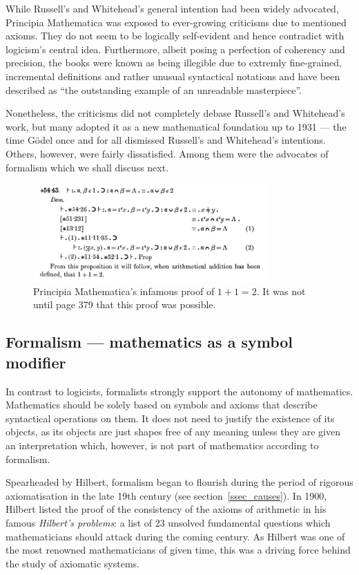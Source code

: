 \documentclass[hidelinks]{article}
\begin{document}
While Russell's and Whitehead's general intention had been widely advocated, Principia Mathematica was exposed to ever-growing criticisms due to mentioned axioms. They do not seem to be logically self-evident and hence contradict with logicism's central idea. Furthermore, albeit posing a perfection of coherency and precision, the books were known as being illegible due to extremly fine-grained, incremental definitions and rather unusual syntactical notations and have been described as ``the outstanding example of an unreadable masterpiece''\cite[p.~154]{math_experience}.

Nonetheless, the criticisms did not completely debase Russell's and Whitehead's work, but many adopted it as a new mathematical foundation up to 1931 --- the time Gödel once and for all dismissed Russell's and Whitehead's intentions. Others, however, were fairly dissatisfied. Among them were the advocates of formalism which we shall discuss next.

\begin{figure}[h]
	\centering
	\includegraphics[width=0.8\textwidth]{img/principia_mathematica.png}
	\caption{Principia Mathematica's infamous proof of $1+1=2$. It was not until page 379 that this proof was possible.}
\end{figure}

\subsection{Formalism --- mathematics as a symbol modifier}\label{ssec_formalism}
In contrast to logicists, formalists strongly support the autonomy of mathematics. 
Mathematics should be solely based on symbols and axioms that describe syntactical operations on them. It does not need to justify the existence of its objects, as its objects are just shapes free of any meaning unless they are given an interpretation which, however, is not part of mathematics according to formalism.

Spearheaded by Hilbert, formalism began to flourish during the period of rigorous axiomatisation in the late 19th century (see section~\ref{ssec_causes}). 
In 1900, Hilbert listed the proof of the consistency of the axioms of arithmetic in his famous \textit{Hilbert's problems}: a list of 23 unsolved fundamental questions which mathematicians should attack during the coming century. As Hilbert was one of the most renowned mathematicians of given time, this was a driving force behind the study of axiomatic systems.
\end{document}

